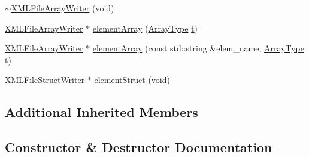 \begin{DoxyCompactItemize}
\item 
\mbox{\hyperlink{classXMLStructWriterAPI_1_1XMLFileArrayWriter_acfdbf7c2c12e6cbed700fb0fc48977e7}{$\sim$\+X\+M\+L\+File\+Array\+Writer}} (void)
\item 
\mbox{\hyperlink{classXMLStructWriterAPI_1_1XMLFileArrayWriter}{X\+M\+L\+File\+Array\+Writer}} $\ast$ \mbox{\hyperlink{classXMLStructWriterAPI_1_1XMLFileArrayWriter_afc24054ffb39df378f8aeb77e029bd59}{element\+Array}} (\mbox{\hyperlink{namespaceXMLStructWriterAPI_a2017208be87c77a32bdc19ea2f14d032}{Array\+Type}} \mbox{\hyperlink{hadron__timeslice_8cc_ac310d9181e916ba43604099aee272c71}{t}})
\item 
\mbox{\hyperlink{classXMLStructWriterAPI_1_1XMLFileArrayWriter}{X\+M\+L\+File\+Array\+Writer}} $\ast$ \mbox{\hyperlink{classXMLStructWriterAPI_1_1XMLFileArrayWriter_ad455da07ae5725cffdab8b056681ec2d}{element\+Array}} (const std\+::string \&elem\+\_\+name, \mbox{\hyperlink{namespaceXMLStructWriterAPI_a2017208be87c77a32bdc19ea2f14d032}{Array\+Type}} \mbox{\hyperlink{hadron__timeslice_8cc_ac310d9181e916ba43604099aee272c71}{t}})
\item 
\mbox{\hyperlink{classXMLStructWriterAPI_1_1XMLFileStructWriter}{X\+M\+L\+File\+Struct\+Writer}} $\ast$ \mbox{\hyperlink{classXMLStructWriterAPI_1_1XMLFileArrayWriter_a53910cfce30307c3333d553b7f018e64}{element\+Struct}} (void)
\end{DoxyCompactItemize}
\subsection*{Additional Inherited Members}


\subsection{Constructor \& Destructor Documentation}
\mbox{\label{classXMLStructWriterAPI_1_1XMLFileArrayWriter_ab4591c76da7c7db03abe6a3e4cf0529a}} 
